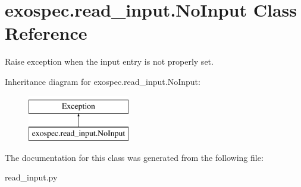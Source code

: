 \hypertarget{classexospec_1_1read__input_1_1_no_input}{}\section{exospec.\+read\+\_\+input.\+No\+Input Class Reference}
\label{classexospec_1_1read__input_1_1_no_input}


Raise exception when the input entry is not properly set.  


Inheritance diagram for exospec.\+read\+\_\+input.\+No\+Input\+:\begin{figure}[H]
\begin{center}
\leavevmode
\includegraphics[height=2.000000cm]{classexospec_1_1read__input_1_1_no_input}
\end{center}
\end{figure}


The documentation for this class was generated from the following file\+:\begin{DoxyCompactItemize}
\item 
read\+\_\+input.\+py\end{DoxyCompactItemize}
